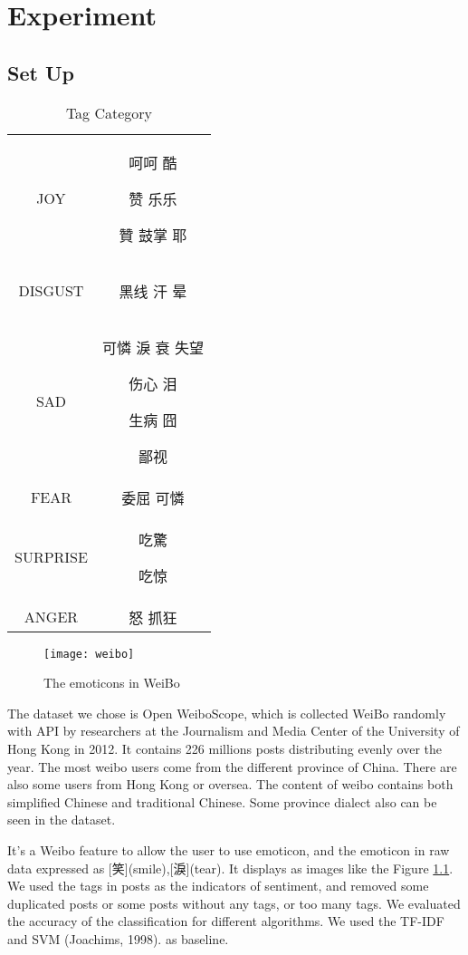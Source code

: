 \chapter{Experiment}

\section{Set Up}

\begin{table}[]
\centering
\caption{Tag Category}
\label{CategoryTable}
\begin{tabular}{|c|c|}
\hline
JOY  & 呵呵 酷 \begin{CJK}{UTF8}{gbsn}赞 乐乐\end{CJK} 贊 鼓掌 耶 \\
DISGUST & \begin{CJK}{UTF8}{gbsn}黑线 汗 晕\end{CJK} \\
SAD &   可憐 淚 衰 失望 \begin{CJK}{UTF8}{gbsn}伤心 泪\end{CJK} 生病 囧 \begin{CJK}{UTF8}{gbsn}鄙视\end{CJK}  \\
FEAR &  委屈  可憐 \\
SURPRISE &  吃驚  \begin{CJK}{UTF8}{gbsn}吃惊\end{CJK} \\
ANGER & 怒 抓狂 \\
\hline
\end{tabular}
\end{table}

\begin{figure}[h]
    \centering
	\texttt{[image: weibo]}
    \caption{The emoticons in WeiBo}
    \label{fig:weibo}
\end{figure}

The dataset we chose is Open WeiboScope\cite{fu2013reality}, which is collected WeiBo randomly with API by researchers at the Journalism and Media Center of the University of Hong Kong in 2012. 
It contains 226 millions posts distributing evenly over the year.  
The most weibo users come from the different province of China. There are also some users from Hong Kong or oversea. 
The content of weibo contains both simplified Chinese and traditional Chinese. Some province dialect also can be seen in the dataset.

It's a Weibo feature to allow the user to use emoticon, 
and the emoticon in raw data expressed as [笑](smile),[淚](tear). It displays as images like the Figure \ref{fig:weibo}. 
We used the tags in posts as the indicators of sentiment, and removed some duplicated posts or some posts without any tags, or too many tags. 
We evaluated the accuracy of the classification for different algorithms. We used the TF-IDF and SVM (Joachims, 1998). as baseline.

